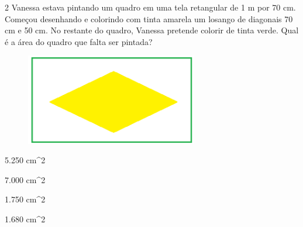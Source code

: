 
\num{2} Vanessa estava pintando um quadro em uma tela retangular de 1 m por
70 cm. Começou desenhando e colorindo com tinta amarela um losango de
diagonais 70 cm e 50 cm. No restante do quadro, Vanessa pretende colorir
de tinta verde. Qual é a área do quadro que falta ser pintada?

\begin{figure}[H]
\centering\includegraphics[width=2.95833in,height=1.56526in]{./imgSAEB_8_MAT/media/image54.png}
\end{figure}
\item 5.250 cm^2
\item 7.000 cm^2
\item 1.750 cm^2
\item 1.680 cm^2















